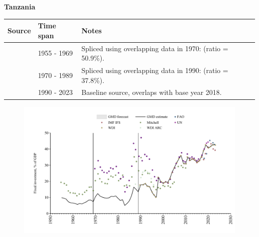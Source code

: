 \documentclass[12pt,a4paper,landscape]{article}
\begin{document}
\begin{adjustbox}{max totalsize={\paperwidth}{\paperheight},center}
\begin{minipage}[t][\textheight][t]{\textwidth}
\vspace*{0.5cm}
{}
\begin{center}
{\Large\bfseries Tanzania}
\end{center}
\vspace{0.5cm}
\begin{table}[H]
\centering
\small
\begin{tabular}{|l|l|l|}
\hline
\textbf{Source} & \textbf{Time span} & \textbf{Notes} \\
\hline
\rowcolor{white}\cite{Mitchell}& 1955 - 1969 &Spliced using overlapping data in 1970: (ratio = 50.9\%).\\
\rowcolor{lightgray}\cite{UN}& 1970 - 1989 &Spliced using overlapping data in 1990: (ratio = 37.8\%).\\
\rowcolor{white}\cite{WDI}& 1990 - 2023 &Baseline source, overlaps with base year 2018.\\
\hline
\end{tabular}
\end{table}
\begin{figure}[H]
\centering
\includegraphics[width=\textwidth,height=0.6\textheight,keepaspectratio]{graphs/TZA_finv_GDP.pdf}
\end{figure}
\end{minipage}
\end{adjustbox}
\end{document}
